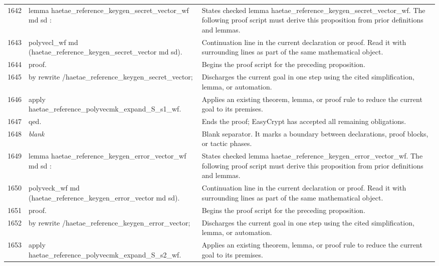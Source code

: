 \documentclass[10pt]{article}
\begin{document}
\begin{longtable}{r L{0.53\textwidth} L{0.37\textwidth}}
1642 & {\ttfamily\scriptsize lemma haetae\_reference\_keygen\_secret\_vector\_wf md sd :} & States checked lemma haetae\_reference\_keygen\_secret\_vector\_wf.  The following proof script must derive this proposition from prior definitions and lemmas. \\
1643 & {\ttfamily\scriptsize   polyvecl\_wf md (haetae\_reference\_keygen\_secret\_vector md sd).} & Continuation line in the current declaration or proof.  Read it with surrounding lines as part of the same mathematical object. \\
1644 & {\ttfamily\scriptsize proof.} & Begins the proof script for the preceding proposition. \\
1645 & {\ttfamily\scriptsize by rewrite /haetae\_reference\_keygen\_secret\_vector;} & Discharges the current goal in one step using the cited simplification, lemma, or automation. \\
1646 & {\ttfamily\scriptsize    apply haetae\_reference\_polyvecmk\_expand\_S\_s1\_wf.} & Applies an existing theorem, lemma, or proof rule to reduce the current goal to its premises. \\
1647 & {\ttfamily\scriptsize qed.} & Ends the proof; EasyCrypt has accepted all remaining obligations. \\
1648 & {\ttfamily\scriptsize \emph{blank}} & Blank separator.  It marks a boundary between declarations, proof blocks, or tactic phases. \\
1649 & {\ttfamily\scriptsize lemma haetae\_reference\_keygen\_error\_vector\_wf md sd :} & States checked lemma haetae\_reference\_keygen\_error\_vector\_wf.  The following proof script must derive this proposition from prior definitions and lemmas. \\
1650 & {\ttfamily\scriptsize   polyveck\_wf md (haetae\_reference\_keygen\_error\_vector md sd).} & Continuation line in the current declaration or proof.  Read it with surrounding lines as part of the same mathematical object. \\
1651 & {\ttfamily\scriptsize proof.} & Begins the proof script for the preceding proposition. \\
1652 & {\ttfamily\scriptsize by rewrite /haetae\_reference\_keygen\_error\_vector;} & Discharges the current goal in one step using the cited simplification, lemma, or automation. \\
1653 & {\ttfamily\scriptsize    apply haetae\_reference\_polyvecmk\_expand\_S\_s2\_wf.} & Applies an existing theorem, lemma, or proof rule to reduce the current goal to its premises. \\

\end{longtable}
\end{document}
